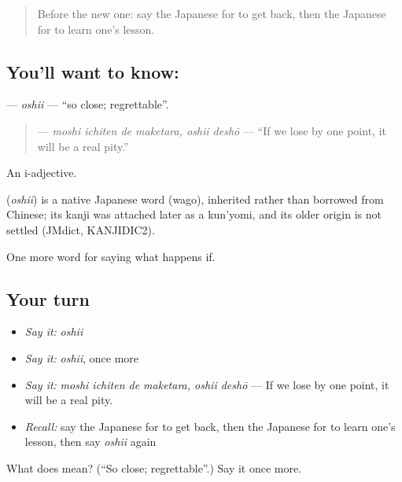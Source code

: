 \label{lesson:JA-C518-oshii}



\begin{quote}
Before the new one: say the Japanese for to get back, then the Japanese for to learn one's lesson.
\end{quote}

\subsection*{You'll want to know: }
\textbf{} — \emph{oshii} — \textquotedblleft{}so close; regrettable\textquotedblright{}.

\begin{quote}
\textbf{  } — \emph{moshi ichiten de maketara, oshii deshō} — \textquotedblleft{}If we lose by one point, it will be a real pity.\textquotedblright{}
\end{quote}

An i-adjective.

\begin{cousinweb}
\textbf{} (\emph{oshii}) is a native Japanese word (wago), inherited rather than borrowed from Chinese; its kanji was attached later as a kun'yomi, and its older origin is not settled (JMdict, KANJIDIC2).
\end{cousinweb}

\begin{grammarlens}[title={What you've built}]
One more word for saying what happens if.
\end{grammarlens}

\subsection*{Your turn}
\begin{itemize}
\raggedright
  \item \emph{Say it:} \emph{oshii}
  \item \emph{Say it:} \emph{oshii}, once more
  \item \emph{Say it:} \emph{moshi ichiten de maketara, oshii deshō} — If we lose by one point, it will be a real pity.
  \item \emph{Recall:} say the Japanese for to get back, then the Japanese for to learn one's lesson, then say \emph{oshii} again
\end{itemize}

\begin{tcolorbox}[breakable,colback=teal!4,colframe=teal!35!black,title={Before you move on}]
What does  mean? (\textquotedblleft{}So close; regrettable\textquotedblright{}.) Say it once more.
\end{tcolorbox}
